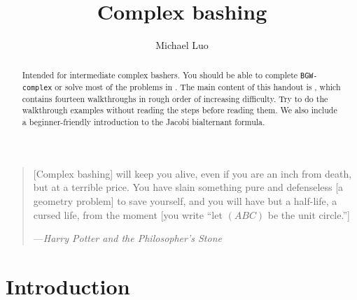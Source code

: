 \documentclass[11pt]{scrartcl}
\title{Complex bashing}
\author{Michael Luo}
\begin{document}
\maketitle

\begin{abstract}
	Intended for intermediate complex bashers. You should be able to complete \texttt{BGW-complex} or solve most of the problems in . The main content of this handout is , which contains fourteen walkthroughs in rough order of increasing difficulty. \alert{Try to do the walkthrough examples without reading the steps before reading them.} We also include a beginner-friendly introduction to the Jacobi bialternant formula.
\end{abstract}

\begin{quote}
	\sffamily\small

	[Complex bashing] will keep you alive, even if you are an inch from death, but at a terrible price. You have slain something pure and defenseless [a geometry problem] to save yourself, and you will have but a half-life, a cursed life, from the moment [you write ``let $(ABC)$ be the unit circle.'']

	\medskip

	---\emph{Harry Potter and the Philosopher's Stone}
\end{quote}

\tableofcontents
\eject

\section{Introduction}
\end{document}
